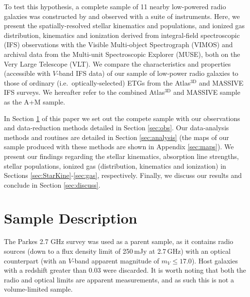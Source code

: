 \documentclass[a4paper,fleqn,usenatbib]{mnras}
\begin{document}
	To test this hypothesis, a complete sample of 11 nearby low-powered radio galaxies was constructed by \citet{Prandoni2010} and observed with a suite of instruments. Here, we present the spatially-resolved stellar kinematics and populations, and ionized gas distribution, kinematics and ionization derived from integral-field spectroscopic (IFS) observations with the Visible Multi-object Spectrograph (VIMOS) and archival data from the Multi-unit Spectroscopic Explorer (MUSE), both on the Very Large Telescope (VLT). We compare the characteristics and properties (accessible with $V$-band IFS data) of our sample of low-power radio galaxies to those of ordinary (i.e.\ optically-selected) ETGs from the Atlas$^\text{3D}$ and MASSIVE IFS surveys. We hereafter refer to the combined Atlas$^\text{3D}$ \citep{Cappellari2011} and MASSIVE \citep{Ma2014} sample as the A+M sample.

	In Section \ref{sec:samp} of this paper we set out the compete sample with our observations and data-reduction methods detailed in Section \ref{sec:obs}. Our data-analysis methods and routines are detailed in Section \ref{sec:analysis} (the maps of our sample produced with these methods are shown in Appendix \ref{sec:maps}). We present our findings regarding the stellar kinematics, absorption line strengths, stellar populations, ionized gas (distribution, kinematics and ionization) in Sections \ref{sec:StarKine}-\ref{sec:gas}, respectively. Finally, we discuss our results and conclude in Section \ref{sec:discuss}.

\section{Sample Description}
	\label{sec:samp}
	The Parkes 2.7 GHz survey \citep{Ekers1989} was used as a parent sample, as it contains radio sources (down to a flux density limit of 250\,mJy at 2.7\,GHz) with an optical counterpart (with an $V$-band apparent magnitude of $m_V \le 17.0$). Host galaxies with a redshift greater than 0.03 were discarded. It is worth noting that both the radio and optical limits are apparent measurements, and as such this is not a volume-limited sample.
\end{document}

